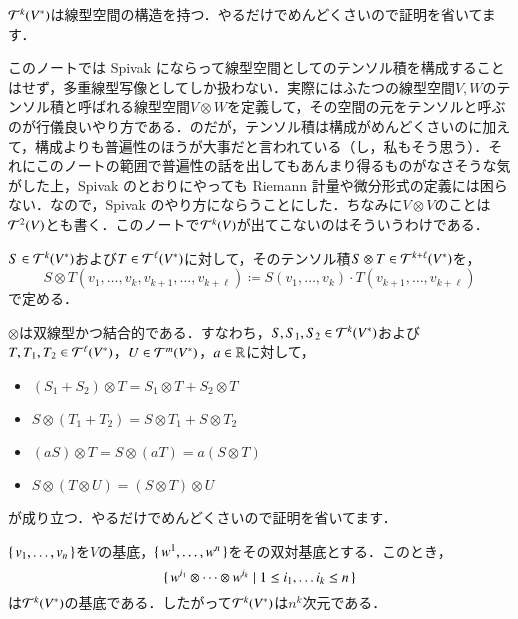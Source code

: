 \begin{que}
$\mathcal{T}^k(V^*)$は線型空間の構造を持つ．やるだけでめんどくさいので証明を省いてます．
\end{que}

\begin{dig}
このノートでは Spivak にならって線型空間としてのテンソル積を構成することはせず，多重線型写像としてしか扱わない．実際にはふたつの線型空間$V,W$のテンソル積と呼ばれる線型空間$V \otimes W$を定義して，その空間の元をテンソルと呼ぶのが行儀良いやり方である．のだが，テンソル積は構成がめんどくさいのに加えて，構成よりも普遍性のほうが大事だと言われている（し，私もそう思う）．それにこのノートの範囲で普遍性の話を出してもあんまり得るものがなさそうな気がした上，Spivak のとおりにやっても Riemann 計量や微分形式の定義には困らない．なので，Spivak のやり方にならうことにした．ちなみに$V \otimes V$のことは$\mathcal{T}^2(V)$とも書く．このノートで$\mathcal{T}^k(V)$が出てこないのはそういうわけである．
\end{dig}

\begin{defi}
$S \in \mathcal{T}^k(V^*)$および$T \in \mathcal{T}^\ell(V^*)$に対して，そのテンソル積$S \otimes T \in \mathcal{T}^{k+\ell}(V^*)$を，
\begin{equation}
S \otimes T(v_1, \dots, v_k, v_{k+1}, \dots, v_{k+\ell}) \coloneqq S(v_1, \dots, v_k) \cdot T(v_{k+1}, \dots, v_{k+\ell})
\end{equation}で定める．
\end{defi}

\begin{que}
$\otimes$は双線型かつ結合的である．すなわち，$S, S_1, S_2 \in \mathcal{T}^k(V^*)$および$T, T_1, T_2 \in \mathcal{T}^\ell(V^*)$，$U \in \mathcal{T}^m(V^*)$，$a\in\mathbb{R}$に対して，
\begin{itemize}
\item $(S_1 + S_2) \otimes T = S_1 \otimes T + S_2 \otimes T$
\item $S \otimes (T_1 + T_2) = S \otimes T_1 + S \otimes T_2$
\item $(aS) \otimes T = S \otimes (aT) = a(S\otimes T)$
\item $S\otimes (T \otimes U) = (S \otimes T) \otimes U$
\end{itemize}
が成り立つ．やるだけでめんどくさいので証明を省いてます．
\end{que}

\begin{prop}
$\set{v_1, \dots, v_n}$を$V$の基底，$\set{w^1, \dots, w^n}$をその双対基底とする．このとき，
\begin{equation}
\set{ w^{i_1} \otimes \dots \otimes w^{i_k} | 1 \leq i_1, \dots i_k \leq n }
\end{equation}は$\mathcal{T}^k(V^*)$の基底である．したがって$\mathcal{T}^k(V^*)$は$n^k$次元である．
\end{prop}

